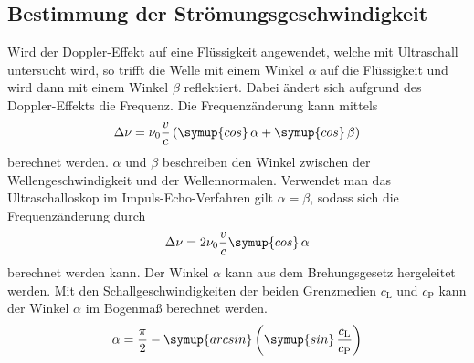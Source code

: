 \subsection{Bestimmung der Strömungsgeschwindigkeit}
\label{subsec:strömung}
Wird der Doppler-Effekt auf eine Flüssigkeit angewendet, welche mit Ultraschall untersucht wird, so trifft die Welle mit einem Winkel $\alpha$ auf die Flüssigkeit
und wird dann mit einem Winkel $\beta$ reflektiert. Dabei ändert sich aufgrund des Doppler-Effekts die Frequenz. Die Frequenzänderung kann mittels
\begin{equation*}
    \Delta\nu = \nu_0\frac{v}{c}\left(\symup{cos}\,\alpha + \symup{cos}\,\beta\right)
\end{equation*}
berechnet werden. $\alpha$ und $\beta$ beschreiben den Winkel zwischen der Wellengeschwindigkeit und der Wellennormalen. Verwendet man das Ultraschalloskop 
im Impuls-Echo-Verfahren gilt $\alpha = \beta$, sodass sich die Frequenzänderung durch 
\begin{equation}
    \Delta\nu = 2\nu_0\frac{v}{c}\symup{cos}\,\alpha
\end{equation}
berechnet werden kann. Der Winkel $\alpha$ kann aus dem Brehungsgesetz hergeleitet werden. Mit den Schallgeschwindigkeiten der beiden Grenzmedien $c_\text{L}$ und $c_\text{P}$
kann der Winkel $\alpha$ im Bogenmaß berechnet werden. 
\begin{equation}
    \label{eqn:alpha}
    \alpha = \frac{\pi}{2} - \symup{arcsin}\left(\symup{sin}\,\frac{c_\text{L}}{c_\text{P}}\right)
\end{equation}

